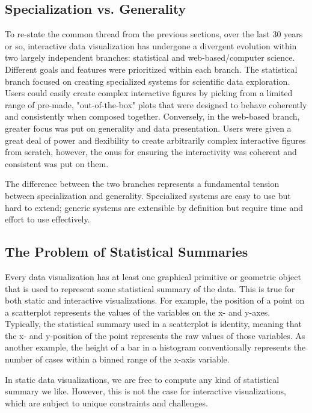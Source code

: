 \documentclass[12pt,a4paper]{article}
\begin{document}
\subsection{Specialization vs. Generality}

To re-state the common thread from the previous sections, over the last 30 years or so, interactive data visualization has undergone a divergent evolution within two largely independent branches: statistical and web-based/computer science. Different goals and features were prioritized within each branch. The statistical branch focused on creating specialized systems for scientific data exploration. Users could easily create complex interactive figures by picking from a limited range of pre-made, "out-of-the-box" plots that were designed to behave coherently and consistently when composed together. Conversely, in the web-based branch, greater focus was put on generality and data presentation. Users were given a great deal of power and flexibility to create arbitrarily complex interactive figures from scratch, however, the onus for ensuring the interactivity was coherent and consistent was put on them.

The difference between the two branches represents a fundamental tension between specialization and generality. Specialized systems are easy to use but hard to extend; generic systems are extensible by definition but require time and effort to use effectively.  

\subsection{The Problem of Statistical Summaries}

Every data visualization has at least one graphical primitive or geometric object that is used to represent some statistical summary of the data. This is true for both static and interactive visualizations. For example, the position of a point on a scatterplot represents the values of the variables on the x- and y-axes. Typically, the statistical summary used in a scatterplot is identity, meaning that the x- and y-position of the point represents the raw values of those variables. As another example, the height of a bar in a histogram conventionally represents the number of cases within a binned range of the x-axis variable. 

In static data visualizations, we are free to compute any kind of statistical summary we like. However, this is not the case for interactive visualizations, which are subject to unique constraints and challenges.
\end{document}

